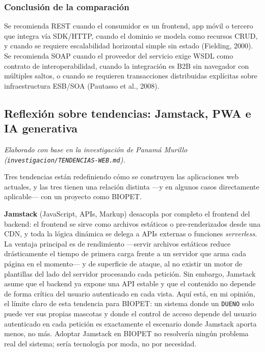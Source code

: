 \documentclass[11pt,a4paper]{article}
\newcommand{\swcite}[1]{\textcolor{blue!40!black}{(#1)}}
\begin{document}
\subsubsection{Conclusión de la comparación}

Se recomienda REST cuando el consumidor es un frontend, app móvil o
tercero que integra vía SDK/HTTP, cuando el dominio se modela como recursos
CRUD, y cuando se requiere escalabilidad horizontal simple sin estado
\swcite{Fielding, 2000}. Se recomienda SOAP cuando el proveedor del
servicio exige WSDL como contrato de interoperabilidad, cuando la
integración es B2B sin navegador con múltiples saltos, o cuando se
requieren transacciones distribuidas explícitas sobre infraestructura
ESB/SOA \swcite{Pautasso et al., 2008}.

\subsection{Reflexión sobre tendencias: Jamstack, PWA e IA generativa}

\emph{Elaborado con base en la investigación de Panamá Murillo
(\texttt{investigacion/TENDENCIAS-WEB.md}).}

Tres tendencias están redefiniendo cómo se construyen las aplicaciones web
actuales, y las tres tienen una relación distinta —y en algunos casos
directamente aplicable— con un proyecto como BIOPET.

\textbf{Jamstack} (JavaScript, APIs, Markup) desacopla por completo el
frontend del backend: el frontend se sirve como archivos estáticos o
pre-renderizados desde una CDN, y toda la lógica dinámica se delega a APIs
externas o funciones \emph{serverless}. La ventaja principal es de
rendimiento —servir archivos estáticos reduce drásticamente el tiempo de
primera carga frente a un servidor que arma cada página en el momento— y de
superficie de ataque, al no existir un motor de plantillas del lado del
servidor procesando cada petición. Sin embargo, Jamstack asume que el
backend ya expone una API estable y que el contenido no depende de forma
crítica del usuario autenticado en cada vista. Aquí está, en mi opinión, el
límite claro de esta tendencia para BIOPET: un sistema donde un
\texttt{DUENO} solo puede ver sus propias mascotas y donde el control de
acceso depende del usuario autenticado en cada petición es exactamente el
escenario donde Jamstack aporta menos, no más. Adoptar Jamstack en BIOPET
no resolvería ningún problema real del sistema; sería tecnología por moda,
no por necesidad.
\end{document}

